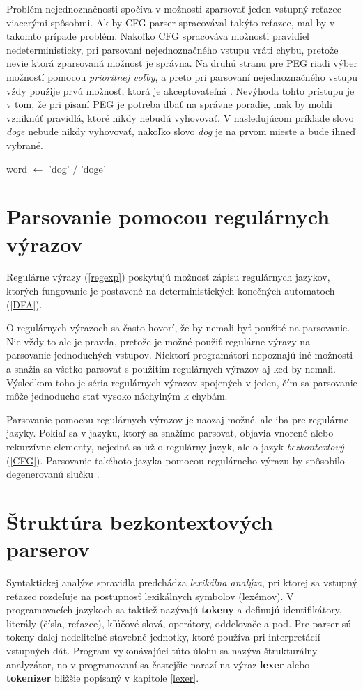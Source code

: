 Problém nejednoznačnosti spočíva v možnosti zparsovať jeden vstupný reťazec viacerými spôsobmi. Ak by CFG parser spracovával takýto reťazec, mal by v takomto prípade problém. Nakoľko CFG spracováva možnosti pravidiel nedeterministicky, pri parsovaní nejednoznačného vstupu vráti chybu, pretože nevie ktorá zparsovaná možnosť je správna. Na druhú stranu pre PEG riadi výber možností pomocou \textit{prioritnej voľby}, a preto pri parsovaní nejednoznačného vstupu vždy použije prvú možnosť, ktorá je akceptovateľná \cite{ford2004parsing}. Nevýhoda tohto prístupu je v tom, že pri písaní PEG je potreba dbať na správne poradie, inak by mohli vzniknúť pravidlá, ktoré nikdy nebudú vyhovovať. V nasledujúcom príklade slovo \textit{doge} nebude nikdy vyhovovať, nakoľko slovo \textit{dog} je na prvom mieste a bude ihneď vybrané.

\begin{center}
word $\leftarrow$ 'dog' / 'doge'
\end{center}

\section{Parsovanie pomocou regulárnych výrazov}
Regulárne výrazy (\ref{regexp}) poskytujú možnosť zápisu regulárnych jazykov, ktorých fungovanie je postavené na deterministických konečných automatoch (\ref{DFA}).

O regulárnych výrazoch sa často hovorí, že by nemali byť použité na parsovanie. Nie vždy to ale je pravda, pretože je možné použiť regulárne výrazy na parsovanie jednoduchých vstupov. Niektorí programátori nepoznajú iné možnosti a snažia sa všetko parsovať s použitím regulárnych výrazov aj keď by nemali. Výsledkom toho je séria regulárnych výrazov spojených v jeden, čím sa parsovanie môže jednoducho stať vysoko náchylným k chybám.

Parsovanie pomocou regulárnych výrazov je naozaj možné, ale iba pre regulárne jazyky. Pokiaľ sa v jazyku, ktorý sa snažíme parsovať, objavia vnorené alebo rekurzívne elementy, nejedná sa už o regulárny jazyk, ale o jazyk \textit{bezkontextový} (\ref{CFG}). Parsovanie takéhoto jazyka pomocou regulárneho výrazu by spôsobilo degenerovanú slučku \cite{ford2004parsing}. 

\section{Štruktúra bezkontextových parserov}
Syntaktickej analýze spravidla predchádza \textit{lexikálna analýza}, pri ktorej sa vstupný reťazec rozdeľuje na postupnosť lexikálnych symbolov (lexémov). V programovacích jazykoch sa taktiež nazývajú \textbf{tokeny} a definujú identifikátory, literály (čísla, reťazce), kľúčové slová, operátory, oddeľovače a pod. Pre parser sú tokeny ďalej nedeliteľné stavebné jednotky, ktoré používa pri interpretácií vstupných dát. Program vykonávajúci túto úlohu sa nazýva štrukturálny analyzátor, no v programovaní sa častejšie narazí na výraz \textbf{lexer} alebo \textbf{tokenizer} bližšie popísaný v kapitole \ref{lexer}. 


